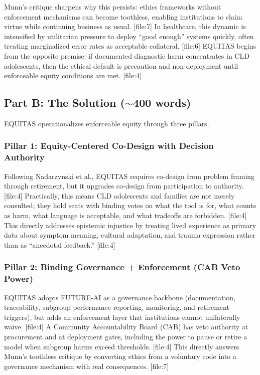 \documentclass[12pt]{article}
\begin{document}
Munn's critique sharpens why this persists: ethics frameworks without enforcement mechanisms can become toothless, enabling institutions to claim virtue while continuing business as usual. [file:7]
In healthcare, this dynamic is intensified by utilitarian pressure to deploy ``good enough'' systems quickly, often treating marginalized error rates as acceptable collateral. [file:6]
EQUITAS begins from the opposite premise: if documented diagnostic harm concentrates in CLD adolescents, then the ethical default is precaution and non-deployment until enforceable equity conditions are met. [file:4]

\subsection{Part B: The Solution (\texorpdfstring{$\sim$}{\textasciitilde}400 words)}
EQUITAS operationalizes enforceable equity through three pillars.

\subsubsection*{Pillar 1: Equity-Centered Co-Design with Decision Authority}
Following Nadarzynski et al., EQUITAS requires co-design from problem framing through retirement, but it upgrades co-design from participation to authority. [file:4]
Practically, this means CLD adolescents and families are not merely consulted; they hold seats with binding votes on what the tool is for, what counts as harm, what language is acceptable, and what tradeoffs are forbidden. [file:4]
This directly addresses epistemic injustice by treating lived experience as primary data about symptom meaning, cultural adaptation, and trauma expression rather than as ``anecdotal feedback.'' [file:4]

\subsubsection*{Pillar 2: Binding Governance + Enforcement (CAB Veto Power)}
EQUITAS adopts FUTURE-AI as a governance backbone (documentation, traceability, subgroup performance reporting, monitoring, and retirement triggers), but adds an enforcement layer that institutions cannot unilaterally waive. [file:4]
A Community Accountability Board (CAB) has veto authority at procurement and at deployment gates, including the power to pause or retire a model when subgroup harms exceed thresholds. [file:4]
This directly answers Munn's toothless critique by converting ethics from a voluntary code into a governance mechanism with real consequences. [file:7]
\end{document}
